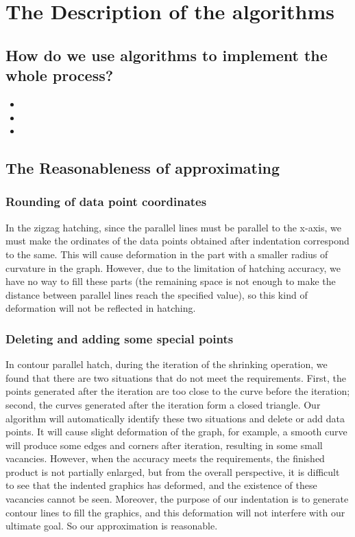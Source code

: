 \documentclass{apmcmthesis}
\begin{document}
\section{The Description of the algorithms}
\subsection{How do we use algorithms to implement the whole process?}

\begin{itemize}
  \item
  \item
  \item
\end{itemize}


\subsection{The Reasonableness of approximating}
\subsubsection{Rounding of data point coordinates}
In the zigzag hatching, since the parallel lines must be parallel to the x-axis, we must make the ordinates of the data points obtained after indentation correspond to the same. This will cause deformation in the part with a smaller radius of curvature in the graph. However, due to the limitation of hatching accuracy, we have no way to fill these parts (the remaining space is not enough to make the distance between parallel lines reach the specified value), so this kind of deformation will not be reflected in hatching.
\subsubsection{Deleting and adding some special points}
In contour parallel hatch, during the iteration of the shrinking operation, we found that there are two situations that do not meet the requirements. First, the points generated after the iteration are too close to the curve before the iteration; second, the curves generated after the iteration form a closed triangle. Our algorithm will automatically identify these two situations and delete or add data points. It will cause slight deformation of the graph, for example, a smooth curve will produce some edges and corners after iteration, resulting in some small vacancies. However, when the accuracy meets the requirements, the finished product is not partially enlarged, but from the overall perspective, it is difficult to see that the indented graphics has deformed, and the existence of these vacancies cannot be seen. Moreover, the purpose of our indentation is to generate contour lines to fill the graphics, and this deformation will not interfere with our ultimate goal. So our approximation is reasonable.
\end{document}
